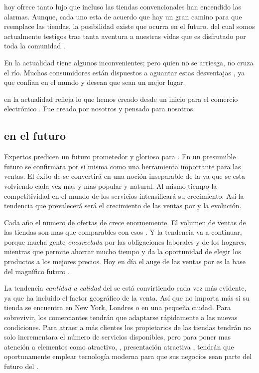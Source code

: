 \ecommerce hoy ofrece tanto lujo que incluso las tiendas convencionales han encendido las alarmas. Aunque, cada uno esta de acuerdo que hay un gran camino para que \ecommerce reemplace las tiendas, la posibilidad existe que ocurra en el futuro. \ecommerce del cual somos actualmente testigos trae tanta aventura a nuestras vidas que es disfrutado por toda la comunidad \online.

En la actualidad \ecommerce tiene algunos inconvenientes; pero quien no se arriesga, no cruza el río. Muchos consumidores están dispuestos a aguantar estas desventajas , ya que confían en el mundo \online y desean que sean un mejor lugar.

\ecommerce en la actualidad refleja lo que hemos creado desde un inicio para el comercio electrónico \online. Fue creado por nosotros y pensado para nosotros.

\subsection{\ecommerce en el futuro}


Expertos predicen un futuro prometedor y glorioso  para \ecommerce. En un presumible futuro \ecommerce se confirmara por si misma como una herramienta importante para las ventas. El éxito de \ecommerce se convertirá en una noción inseparable de la \web ya que \eshopping se esta volviendo cada vez mas y mas popular y natural. Al mismo tiempo la competitividad en el mundo de los servicios \ecommerce intensificará su crecimiento. Así la tendencia que  prevalecerá \ecommerce será el crecimiento de las ventas por \internet y la evolución.

Cada año el numero de ofertas de \ecommerce crece enormemente. El volumen de ventas de las tiendas \online  son mas que comparables con esos \brickandmortar. Y la tendencia va a continuar, porque mucha gente \textit{encarcelada} por las obligaciones laborales y de los hogares, mientras que \internet permite ahorrar mucho tiempo y da la oportunidad de elegir los productos a los mejores precios. Hoy en día el auge de las ventas por \internet es la base del magnífico futuro \ecommerce.

La tendencia \textit{cantidad a calidad} del \ecommerce se está convirtiendo cada vez más evidente, ya que \internet ha incluido el factor geográfico de la venta. Así que no importa más si su tienda se encuentra en New York, Londres o en una pequeña ciudad. Para sobrevivir, los comerciantes tendrán que adaptarse rápidamente a las nuevas condiciones. Para atraer a más clientes los propietarios de las tiendas \online tendrán no solo incrementara el número de servicios disponibles, pero para poner mas atención a elementos como \design atractivo, \userfriendliness, presentación atractiva , tendrán que oportunamente emplear tecnología moderna para que sus negocios sean parte del futuro del \ecommerce.

